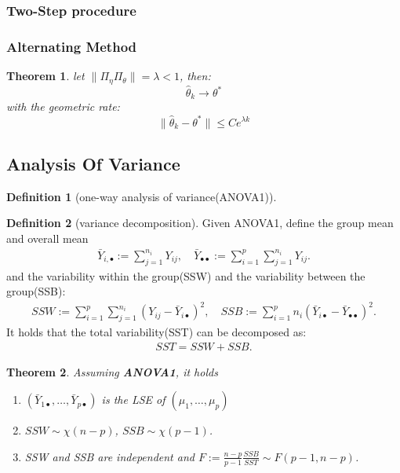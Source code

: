 \documentclass[a4paper,12pt, oneside, fleqn]{book}
\newtheorem{theorem}{Theorem}[section]
\theoremstyle{definition}
\newtheorem{definition}{Definition}[section]
\theoremstyle{remark}
\begin{document}
\subsubsection*{Two-Step procedure}


\subsubsection*{Alternating Method}
\begin{theorem}
	let $\| \Pi_\eta \Pi_\theta\| = \lambda < 1$, then:
	\begin{equation*}
		\hat{\theta}_k \longrightarrow \theta^* 
	\end{equation*}
	with the geometric rate:
	\begin{equation*}
		\|\hat{\theta}_k - \theta^*\| \leq Ce^{\lambda k}
	\end{equation*}
\end{theorem}


\subsection{Analysis Of Variance}
\begin{definition}[one-way analysis of variance(ANOVA1)]
\end{definition}

\begin{definition}[variance decomposition]
	Given ANOVA1, define the group mean and overall mean 
	\begin{align*}
		\bar{Y}_{i, \bullet}:= \sum_{j = 1}^{n_i} Y_{ij}, \quad \bar{Y}_{\bullet\bullet}:= \sum_{i = 1}^p \sum_{j = 1}^{n_i} Y_{ij}.
	\end{align*}
	and the variability within the group(SSW) and the variability between the group(SSB):
	\begin{align*}
		SSW:=  \sum_{i = 1}^p \sum_{j = 1}^{n_i}(Y_{ij} - \bar{Y}_{i\bullet})^2, \quad SSB:= \sum_{i = 1}^p n_i ( \bar{Y}_{i\bullet} - \bar{Y}_{\bullet\bullet})^2. 
	\end{align*}
	It holds that the total variability(SST) can be decomposed  as:
	\begin{align*}
		SST = SSW + SSB.
	\end{align*}
\end{definition}

\begin{theorem}
	Assuming \textbf{ANOVA1}, it holds
	\begin{enumerate}
		\item $(\bar{Y}_{1\bullet}, \dots, \bar{Y}_{p\bullet})$ is the LSE of $(\mu_1, \dots, \mu_p)$
		\item $SSW \sim \chi(n - p)$, $SSB \sim \chi ( p -1)$. 
		\item SSW and SSB are independent and  $F :=  \frac{n - p}{p -1} \frac{SSB}{SST} \sim F(p - 1, n - p)$. 
	\end{enumerate}
\end{theorem}
\end{document}
